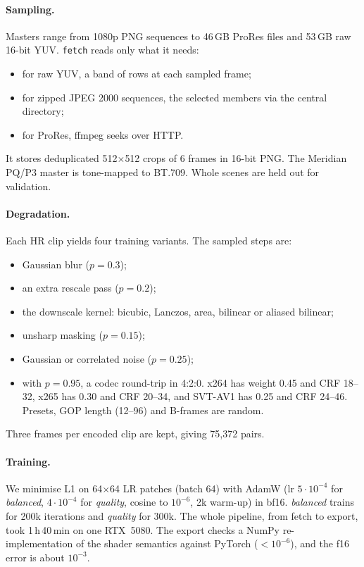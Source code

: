 \documentclass[10pt,twocolumn,letterpaper]{article}
\begin{document}
\paragraph{Sampling.} Masters range from 1080p PNG sequences to 46\,GB ProRes files and 53\,GB raw
16-bit YUV. \texttt{fetch} reads only what it needs:
\begin{itemize}
\setlength\itemsep{0pt}
\item for raw YUV, a band of rows at each sampled frame;
\item for zipped JPEG 2000 sequences, the selected members via the central directory;
\item for ProRes, ffmpeg seeks over HTTP.
\end{itemize}
It stores deduplicated 512$\times$512 crops of 6 frames in 16-bit PNG. The Meridian PQ/P3 master is
tone-mapped to BT.709. Whole scenes are held out for validation.

\paragraph{Degradation.} Each HR clip yields four training variants. The sampled steps are:
\begin{itemize}
\setlength\itemsep{0pt}
\item Gaussian blur ($p{=}0.3$);
\item an extra rescale pass ($p{=}0.2$);
\item the downscale kernel: bicubic, Lanczos, area, bilinear or aliased bilinear;
\item unsharp masking ($p{=}0.15$);
\item Gaussian or correlated noise ($p{=}0.25$);
\item with $p{=}0.95$, a codec round-trip in 4:2:0. x264 has weight 0.45 and CRF 18--32, x265 has
0.30 and CRF 20--34, and SVT-AV1 has 0.25 and CRF 24--46. Presets, GOP length (12--96) and
B-frames are random.
\end{itemize}
Three frames per encoded clip are kept, giving 75{,}372 pairs.



\paragraph{Training.} We minimise L1 on 64$\times$64 LR patches (batch 64) with AdamW (lr
$5{\cdot}10^{-4}$ for \emph{balanced}, $4{\cdot}10^{-4}$ for \emph{quality}, cosine to $10^{-6}$,
2k warm-up) in bf16. \emph{balanced} trains for 200k iterations and \emph{quality} for 300k. The
whole pipeline, from fetch to export, took 1\,h\,40\,min on one RTX~5080. The export checks a NumPy
re-implementation of the shader semantics against PyTorch ($<10^{-6}$), and the f16 error is
about $10^{-3}$.
\end{document}

